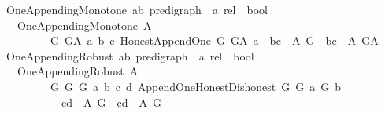 \begin{isabellebody}
\ One{\isacharunderscore}{\kern0pt}Appending{\isacharunderscore}{\kern0pt}Monotone{\isacharcolon}{\kern0pt}{\isacharcolon}{\kern0pt}\ {\isachardoublequoteopen}{\isacharparenleft}{\kern0pt}{\isacharparenleft}{\kern0pt}{\isacharprime}{\kern0pt}a{\isacharcomma}{\kern0pt}{\isacharprime}{\kern0pt}b{\isacharparenright}{\kern0pt}\ pre{\isacharunderscore}{\kern0pt}digraph\ {\isasymRightarrow}\ {\isacharprime}{\kern0pt}a\ rel{\isacharparenright}{\kern0pt}\ {\isasymRightarrow}\ bool\ {\isachardoublequoteclose}\isanewline
\ \ \ {\isachardoublequoteopen}One{\isacharunderscore}{\kern0pt}Appending{\isacharunderscore}{\kern0pt}Monotone\ A\ {\isasymequiv}\isanewline
\ \ \ \ \ \ \ \ \ {\isacharparenleft}{\kern0pt}{\isasymforall}G\ G{\isacharunderscore}{\kern0pt}A\ a\ b\ c{\isachardot}{\kern0pt}\ Honest{\isacharunderscore}{\kern0pt}Append{\isacharunderscore}{\kern0pt}One\ G\ G{\isacharunderscore}{\kern0pt}A\ a\ {\isasymlongrightarrow}\ {\isacharparenleft}{\kern0pt}{\isacharparenleft}{\kern0pt}b{\isacharcomma}{\kern0pt}c{\isacharparenright}{\kern0pt}\ {\isasymin}\ {\isacharparenleft}{\kern0pt}A\ G{\isacharparenright}{\kern0pt}\ {\isasymlongrightarrow}\ {\isacharparenleft}{\kern0pt}b{\isacharcomma}{\kern0pt}c{\isacharparenright}{\kern0pt}\ {\isasymin}\ {\isacharparenleft}{\kern0pt}A\ G{\isacharunderscore}{\kern0pt}A{\isacharparenright}{\kern0pt}{\isacharparenright}{\kern0pt}{\isacharparenright}{\kern0pt}{\isachardoublequoteclose}\isanewline
\isanewline
\isanewline
{}\isamarkupfalse%
\ One{\isacharunderscore}{\kern0pt}Appending{\isacharunderscore}{\kern0pt}Robust{\isacharcolon}{\kern0pt}{\isacharcolon}{\kern0pt}\ {\isachardoublequoteopen}{\isacharparenleft}{\kern0pt}{\isacharparenleft}{\kern0pt}{\isacharprime}{\kern0pt}a{\isacharcomma}{\kern0pt}{\isacharprime}{\kern0pt}b{\isacharparenright}{\kern0pt}\ pre{\isacharunderscore}{\kern0pt}digraph\ {\isasymRightarrow}\ {\isacharprime}{\kern0pt}a\ rel{\isacharparenright}{\kern0pt}\ {\isasymRightarrow}\ bool\ {\isachardoublequoteclose}\isanewline
\ \ \ {\isachardoublequoteopen}One{\isacharunderscore}{\kern0pt}Appending{\isacharunderscore}{\kern0pt}Robust\ A\ {\isasymequiv}\isanewline
\ \ \ \ \ \ \ \ \ {\isacharparenleft}{\kern0pt}{\isasymforall}G\ G{\isacharprime}{\kern0pt}\ G{\isacharprime}{\kern0pt}{\isacharprime}{\kern0pt}\ a\ b\ c\ d{\isachardot}{\kern0pt}\ Append{\isacharunderscore}{\kern0pt}One{\isacharunderscore}{\kern0pt}Honest{\isacharunderscore}{\kern0pt}Dishonest\ G\ G{\isacharprime}{\kern0pt}\ a\ G{\isacharprime}{\kern0pt}{\isacharprime}{\kern0pt}\ b\isanewline
\ \ \ \ \ \ \ \ \ \ {\isasymlongrightarrow}\ {\isacharparenleft}{\kern0pt}{\isacharparenleft}{\kern0pt}c{\isacharcomma}{\kern0pt}d{\isacharparenright}{\kern0pt}\ {\isasymin}\ {\isacharparenleft}{\kern0pt}A\ G{\isacharparenright}{\kern0pt}\ {\isasymlongrightarrow}\ {\isacharparenleft}{\kern0pt}c{\isacharcomma}{\kern0pt}d{\isacharparenright}{\kern0pt}\ {\isasymin}\ {\isacharparenleft}{\kern0pt}A\ G{\isacharprime}{\kern0pt}{\isacharprime}{\kern0pt}{\isacharparenright}{\kern0pt}{\isacharparenright}{\kern0pt}{\isacharparenright}{\kern0pt}{\isachardoublequoteclose}\isanewline

\end{isabellebody}
